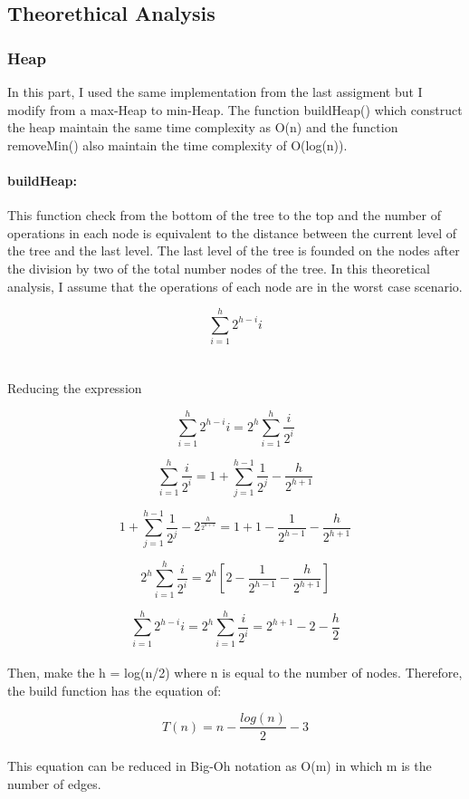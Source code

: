 \documentclass{article}
\begin{document}
\subsection{Theorethical Analysis}
\subsubsection{Heap}
In this part, I used the same implementation from the last assigment but I modify from a max-Heap to min-Heap. The function buildHeap() which construct the heap maintain the same time complexity as O(n) and the function removeMin() also maintain the time complexity of O(log(n)).\\

\paragraph{buildHeap:}This function check from the bottom of the tree to the top and the number of operations in each node is equivalent to the distance between the current level of the tree and the last level. The last level of the tree is founded on the nodes after the division by two of the total number nodes of the tree. In this theoretical analysis, I assume that the operations of each node are in the worst case scenario.

$$\sum_{i=1}^{h} 2^{h-i} i$$\\
\\
Reducing the expression

$$\sum_{i=1}^{h} 2^{h-i} i = 2^{h} \sum_{i=1}^{h} \frac{i}{2^{i}} $$

$$\sum_{i=1}^{h} \frac{i}{2^{i}}  = 1 + \sum_{j=1}^{h-1} \frac{1}{2^{j}}  - \frac{h}{2^{h+1}}$$

$$1 + \sum_{j=1}^{h-1} \frac{1}{2^{j}}  - 2^{\frac{h}{2^{h+1}}} = 1 + 1 - \frac{1}{2^{h-1}}  - \frac{h}{2^{h+1}}$$

$$ 2^{h} \sum_{i=1}^{h} \frac{i}{2^{i}} = 2^{h} [2 - \frac{1}{2^{h-1}}  - \frac{h}{2^{h+1}} ]$$

$$\sum_{i=1}^{h} 2^{h-i} i =  2^{h} \sum_{i=1}^{h} \frac{i}{2^{i}} = 2^{h+1} - 2 - \frac{h}{2} $$\\

Then, make the h = log(n/2) where n is equal to the number of nodes. Therefore, the build function has the equation of:

$$T(n) = n - \frac{log(n)}{2} - 3 $$\\

This equation can be reduced in Big-Oh notation as O(m) in which m is the number of edges.\\\\
\end{document}
